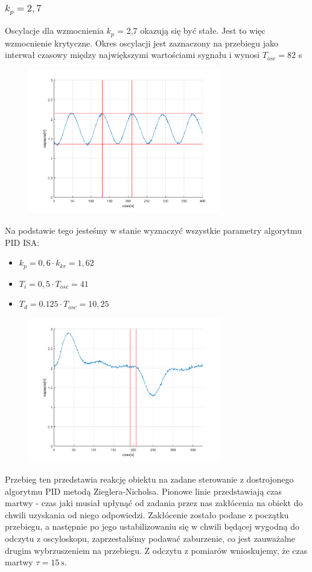 \documentclass[a4paper, 12pt]{article}
\begin{document}
			\subsubsection{$k_p = 2,7$}
				Oscylacje dla wzmocnienia $k_p$ = 2,7 okazują się być stałe. Jest to więc wzmocnienie krytyczne. Okres oscylacji jest zaznaczony na przebiegu jako interwał czasowy między największymi wartościami sygnału i wynosi $T_{osc} = 82$ s
				\begin{figure}[H]
					\centering
					\includegraphics[width=0.75\textwidth]{./img/oki.png}
				\end{figure}
				Na podstawie tego jesteśmy w stanie wyznaczyć wszystkie parametry algorytmu PID ISA:
				\begin{itemize}
					\item $k_{p} = 0,6 \cdot k_{kr} =  1,62$ 
					\item $T_i = 0,5 \cdot T_{osc} = 41$
					\item $T_d = 0.125 \cdot T_{osc} = 10,25$
				\end{itemize}
				\begin{figure}[H]
					\centering
					\includegraphics[width=0.75\textwidth]{./img/ZN.png}
				\end{figure}
				Przebieg ten przedstawia reakcję obiektu na zadane sterowanie z dostrojonego algorytmu PID metodą Zieglera-Nicholsa. Pionowe linie przedstawiają czas martwy - czas jaki musiał upłynąć od zadania przez nas zakłócenia na obiekt do chwili uzyskania od niego odpowiedzi. Zakłócenie zostało podane z początku przebiegu, a następnie po jego ustabilizowaniu się w chwili będącej wygodną do odczytu z oscyloskopu, zaprzestaliśmy podawać zaburzenie, co jest zauważalne drugim wybrzuszeniem na przebiegu. Z odczytu z pomiarów wnioskujemy, że czas martwy $\tau = 15 \ \mathrm{s}$.
\end{document}

